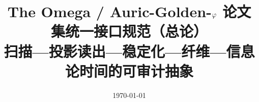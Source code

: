 \documentclass[11pt,letterpaper]{ctexart}
\title{The Omega / Auric-Golden-$\varphi$ 论文集统一接口规范（总论）\\\large 扫描—投影读出—稳定化—纤维—信息论时间的可审计抽象}
\author{}
\date{\today}
\begin{document}
\maketitle










\FloatBarrier
\appendix


\end{document}
